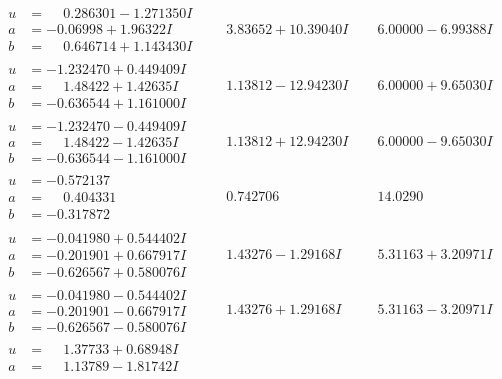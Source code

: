 \documentclass[1p]{elsarticle_modified}
\theoremstyle{definition}
\begin{document}
$$\begin{array}{c|c|c}
\begin{aligned}
u &= \phantom{-}0.286301 - 1.271350 I \\
a &= -0.06998 + 1.96322 I \\
b &= \phantom{-}0.646714 + 1.143430 I\end{aligned}
 & \phantom{-}3.83652 + 10.39040 I & \phantom{-}6.00000 - 6.99388 I \\ \hline\begin{aligned}
u &= -1.232470 + 0.449409 I \\
a &= \phantom{-}1.48422 + 1.42635 I \\
b &= -0.636544 + 1.161000 I\end{aligned}
 & \phantom{-}1.13812 - 12.94230 I & \phantom{-}6.00000 + 9.65030 I \\ \hline\begin{aligned}
u &= -1.232470 - 0.449409 I \\
a &= \phantom{-}1.48422 - 1.42635 I \\
b &= -0.636544 - 1.161000 I\end{aligned}
 & \phantom{-}1.13812 + 12.94230 I & \phantom{-}6.00000 - 9.65030 I \\ \hline\begin{aligned}
u &= -0.572137\phantom{ +0.000000I} \\
a &= \phantom{-}0.404331\phantom{ +0.000000I} \\
b &= -0.317872\phantom{ +0.000000I}\end{aligned}
 & \phantom{-}0.742706\phantom{ +0.000000I} & \phantom{-}14.0290\phantom{ +0.000000I} \\ \hline\begin{aligned}
u &= -0.041980 + 0.544402 I \\
a &= -0.201901 + 0.667917 I \\
b &= -0.626567 + 0.580076 I\end{aligned}
 & \phantom{-}1.43276 - 1.29168 I & \phantom{-}5.31163 + 3.20971 I \\ \hline\begin{aligned}
u &= -0.041980 - 0.544402 I \\
a &= -0.201901 - 0.667917 I \\
b &= -0.626567 - 0.580076 I\end{aligned}
 & \phantom{-}1.43276 + 1.29168 I & \phantom{-}5.31163 - 3.20971 I \\ \hline\begin{aligned}
u &= \phantom{-}1.37733 + 0.68948 I \\
a &= \phantom{-}1.13789 - 1.81742 I \\

\end{aligned}
\end{array}$$
\end{document}
